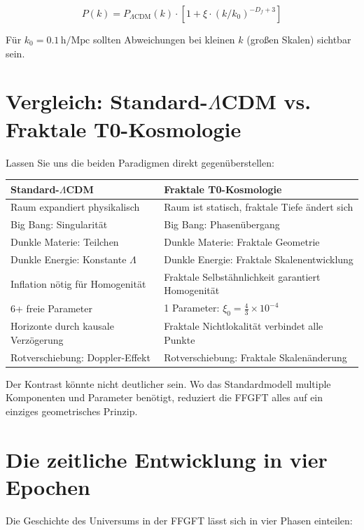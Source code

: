 \documentclass[12pt,a4paper]{article}
\begin{document}
\begin{equation}
P(k) = P_{\Lambda\text{CDM}}(k) \cdot \left[1 + \xi \cdot (k/k_0)^{-D_f+3}\right]
\end{equation}

Für $k_0 = 0.1 \, \text{h/Mpc}$ sollten Abweichungen bei kleinen $k$ (großen Skalen) sichtbar sein.

\section{Vergleich: Standard-$\Lambda$CDM vs. Fraktale T0-Kosmologie}

Lassen Sie uns die beiden Paradigmen direkt gegenüberstellen:

\begin{center}
\small
\begin{tabular}{p{}|p{}}
\toprule
\textbf{Standard-$\Lambda$CDM} & \textbf{Fraktale T0-Kosmologie} \\
\midrule
Raum expandiert physikalisch & Raum ist statisch, fraktale Tiefe ändert sich \\
Big Bang: Singularität & Big Bang: Phasenübergang \\
Dunkle Materie: Teilchen & Dunkle Materie: Fraktale Geometrie \\
Dunkle Energie: Konstante $\Lambda$ & Dunkle Energie: Fraktale Skalenentwicklung \\
Inflation nötig für Homogenität & Fraktale Selbstähnlichkeit garantiert Homogenität \\
6+ freie Parameter & 1 Parameter: $\xi_0 = \frac{4}{3} \times 10^{-4}$ \\
Horizonte durch kausale Verzögerung & Fraktale Nichtlokalität verbindet alle Punkte \\
Rotverschiebung: Doppler-Effekt & Rotverschiebung: Fraktale Skalenänderung \\
\bottomrule
\end{tabular}
\end{center}

Der Kontrast könnte nicht deutlicher sein. Wo das Standardmodell multiple Komponenten und Parameter benötigt, reduziert die FFGFT alles auf ein einziges geometrisches Prinzip.

\section{Die zeitliche Entwicklung in vier Epochen}

Die Geschichte des Universums in der FFGFT lässt sich in vier Phasen einteilen:
\end{document}
